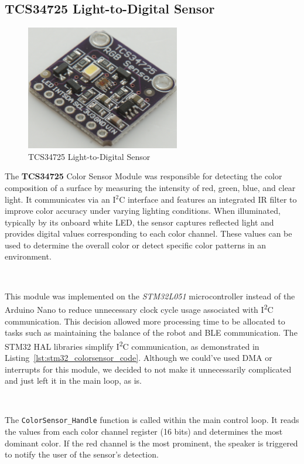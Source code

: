 \documentclass{article}
\begin{document}
\subsection{TCS34725 Light-to-Digital Sensor}
\label{sec:colorsensor}
\begin{figure}[H]
    \centering
    \includegraphics[width=0.6\textwidth]{Figures/colorsensor.jpg} %
    \caption{TCS34725 Light-to-Digital Sensor}
    \label{fig:colorsensor}


\end{figure}

The \textbf{TCS34725} Color Sensor Module was responsible for detecting the color composition of a surface by measuring the intensity of red, green, blue, and clear light. It communicates via an I$^2$C interface and features an integrated IR filter to improve color accuracy under varying lighting conditions. When illuminated, typically by its onboard white LED, the sensor captures reflected light and provides digital values corresponding to each color channel. These values can be used to determine the overall color or detect specific color patterns in an environment.

\

This module was implemented on the \emph{STM32L051} microcontroller instead of the Arduino Nano to reduce unnecessary clock cycle usage associated with I\textsuperscript{2}C communication. This decision allowed more processing time to be allocated to tasks such as maintaining the balance of the robot and BLE communication. The STM32 HAL libraries simplify I\textsuperscript{2}C communication, as demonstrated in Listing~\ref{lst:stm32_colorsensor_code}. Although we could've used DMA or interrupts for this module, we decided to not make it unnecessarily complicated and just left it in the main loop, as is.

\

The \texttt{ColorSensor\_Handle} function is called within the main control loop. It reads the values from each color channel register (16 bits) and determines the most dominant color. If the red channel is the most prominent, the speaker is triggered to notify the user of the sensor's detection.
\end{document}
